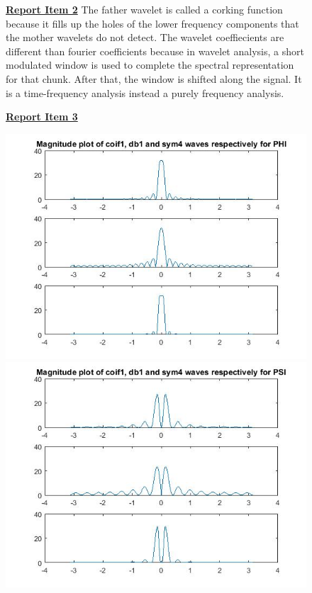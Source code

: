 \documentclass{article}
\begin{document}
\begin{figure}[H]
\color{red}
\underline{\textbf{Report Item 2}}
\color{black}
The father wavelet is called a corking function because it fills up the holes of the lower frequency components that the mother wavelets do not detect. The wavelet coeffiecients are different than fourier coefficients because in wavelet analysis, a short modulated window is used to complete
the spectral representation for that chunk. After that, the window is shifted along the signal. It is a time-frequency analysis instead a purely frequency analysis.
\end{figure}


\begin{figure}[H]
\color{red}
\underline{\textbf{Report Item 3}}
\color{black}

\includegraphics[scale=.5]{2_phi}
\includegraphics[scale=.5]{2_psi}
\end{figure}
\end{document}
